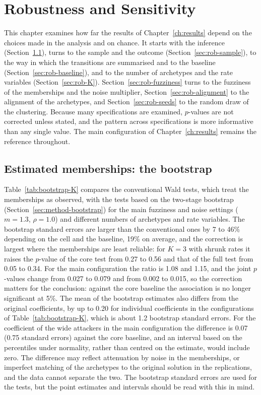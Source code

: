 \chapter{Robustness and Sensitivity}
\label{ch:robustness}

This chapter examines how far the results of Chapter~\ref{ch:results} depend on the choices made in the analysis and on chance. It starts with the inference (Section~\ref{sec:rob-bootstrap}), turns to the sample and the outcome (Section~\ref{sec:rob-sample}), to the way in which the transitions are summarised and to the baseline (Section~\ref{sec:rob-baseline}), and to the number of archetypes and the rate variables (Section~\ref{sec:rob-K}). Section~\ref{sec:rob-fuzziness} turns to the fuzziness of the memberships and the noise multiplier, Section~\ref{sec:rob-alignment} to the alignment of the archetypes, and Section~\ref{sec:rob-seeds} to the random draw of the clustering. Because many specifications are examined, $p$-values are not corrected unless stated, and the pattern across specifications is more informative than any single value. The main configuration of Chapter~\ref{ch:results} remains the reference throughout.

\section{Estimated memberships: the bootstrap}
\label{sec:rob-bootstrap}

Table~\ref{tab:bootstrap-K} compares the conventional Wald tests, which treat the memberships as observed, with the tests based on the two-stage bootstrap (Section~\ref{sec:method-bootstrap}) for the main fuzziness and noise settings ($m=1.3$, $\rho=1.0$) and different numbers of archetypes and rate variables. The bootstrap standard errors are larger than the conventional ones by 7 to 46\% depending on the cell and the baseline, 19\% on average, and the correction is largest where the memberships are least reliable: for $K=3$ with shrunk rates it raises the $p$-value of the core test from 0.27 to 0.56 and that of the full test from 0.05 to 0.34. For the main configuration the ratio is 1.08 and 1.15, and the joint $p$-values change from 0.027 to 0.079 and from 0.002 to 0.015, so the correction matters for the conclusion: against the core baseline the association is no longer significant at 5\%. The mean of the bootstrap estimates also differs from the original coefficients, by up to 0.20 for individual coefficients in the configurations of Table~\ref{tab:bootstrap-K}, which is about 1.2 bootstrap standard errors. For the coefficient of the wide attackers in the main configuration the difference is 0.07 (0.75 standard errors) against the core baseline, and an interval based on the percentiles under normality, rather than centred on the estimate, would include zero. The difference may reflect attenuation by noise in the memberships, or imperfect matching of the archetypes to the original solution in the replications, and the data cannot separate the two. The bootstrap standard errors are used for the tests, but the point estimates and intervals should be read with this in mind.

